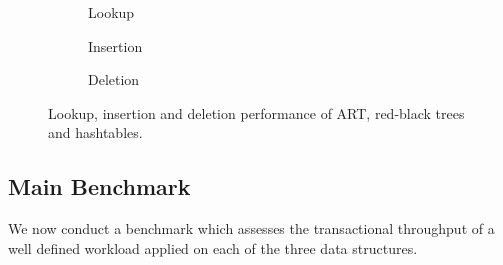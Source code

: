 \documentclass[abstracton,12pt]{scrartcl}
\theoremstyle{definition}
\begin{document}
\begin{figure}[H]
  \centering
  \begin{subfigure}[b]{0.3\textwidth}
    \caption{Lookup}
    \label{fig:lookup-microbenchmark}
  \end{subfigure}
  \begin{subfigure}[b]{0.3\textwidth}
    \caption{Insertion}
    \label{fig:insertion-microbenchmark}
  \end{subfigure}
  \begin{subfigure}[b]{0.3\textwidth}
    \caption{Deletion}
    \label{fig:deletion-microbenchmark}
  \end{subfigure}
  \caption{Lookup, insertion and deletion performance of ART,
  red-black trees and hashtables.}
  \label{fig:microbenchmark}
\end{figure}

\subsection{Main Benchmark}
\label{sec:main-benchmark}

We now conduct a benchmark which assesses the transactional throughput of 
a well defined workload applied on each of the three data structures.
\end{document}
